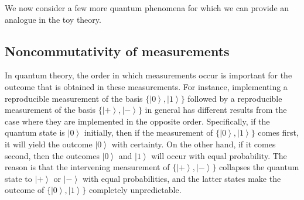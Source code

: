 \documentclass[pra,nofootinbib,showpacs,12pt]{revtex4}
\begin{document}
We now consider a few more quantum phenomena for which we can provide an
analogue in the toy theory.

\subsection{Noncommutativity of measurements}

\label{non-commutativity}

In quantum theory, the order in which measurements occur is important for
the outcome that is obtained in these measurements. For instance,
implementing a reproducible measurement of the basis $\{\left|
0\right\rangle ,\left| 1\right\rangle \}$ followed by a reproducible
measurement of the basis $\{\left| +\right\rangle ,\left| -\right\rangle \}$
in general has different results from the case where they are implemented in
the opposite order. Specifically, if the quantum state is $\left|
0\right\rangle $ initially, then if the measurement of $\{\left|
0\right\rangle ,\left| 1\right\rangle \}$ comes first, it will yield the
outcome $\left| 0\right\rangle $ with certainty. On the other hand, if it
comes second, then the outcomes $\left| 0\right\rangle $ and $\left|
1\right\rangle $ will occur with equal probability. The reason is that the
intervening measurement of $\{\left| +\right\rangle ,\left| -\right\rangle
\} $ collapses the quantum state to $\left| +\right\rangle $ or $\left|
-\right\rangle $ with equal probabilities, and the latter states make the
outcome of $\{\left| 0\right\rangle ,\left| 1\right\rangle \}$ completely
unpredictable.
\end{document}
